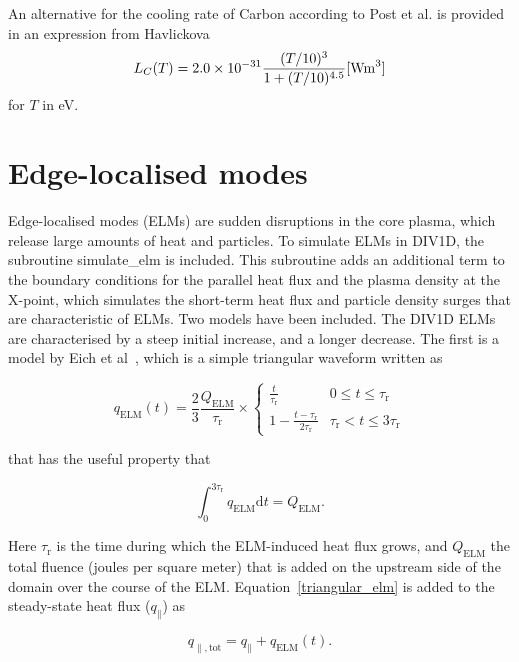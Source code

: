 \documentclass[amsmath,amssymb,a4]{revtex4-2}
\begin{document}
An alternative for the cooling rate of Carbon according to Post et al. is provided in an expression from Havlickova \cite{havlickova2013}
\begin{equation}
    L_C(T) = 2.0 \times 10^{-31} {(T/10)^3 \over 1 + (T/10)^{4.5}} [{\rm W m}^3]
\end{equation}
for $T$ in eV.


\section{Edge-localised modes}
\label{section:elms}

Edge-localised modes (ELMs) are sudden disruptions in the core plasma, which release large amounts of heat and particles. To simulate ELMs in DIV1D, the subroutine simulate\_elm is included. This subroutine adds an additional term to the boundary conditions for the parallel heat flux and the plasma density at the X-point, which simulates the short-term  heat flux and particle density surges that are characteristic of ELMs. Two models have been included. The DIV1D ELMs are characterised by a steep initial increase, and a longer decrease. The first is a model by Eich et al~\cite{eich2017}, which is a simple triangular waveform written as

\begin{equation}
\label{triangular_elm}
q_{\mathrm{ELM}}(t)=\frac{2}{3}\frac{Q_{\mathrm{ELM}}}{\tau_{\mathrm{r}}}\times
\left\{
\begin{matrix}
\frac{t}{\tau_{\mathrm{\mathrm{r}}}} &
0 \leq t \leq \tau_{\mathrm{r}} \\
1-\frac{t-\tau_{\mathrm{r}}}{2\tau_{\mathrm{r}}} &
\tau_{\mathrm{r}} < t \leq 3\tau_{\mathrm{r}}
\end{matrix}
\right.
\end{equation}

that has the useful property that

\begin{equation}
\int_{0}^{3\tau_{\mathrm{r}}} q_{\mathrm{ELM}} \mathrm{d}t=Q_{\mathrm{ELM}}.
\end{equation}

Here $\tau_{\mathrm{r}}$ is the time during which the ELM-induced heat flux grows, and $Q_{\mathrm{ELM}}$ the total fluence (joules per square meter) that is added on the upstream side of the domain over the course of the ELM. Equation~\ref{triangular_elm} is added to the steady-state heat flux ($q_{\parallel}$) as

\begin{equation}
\label{elm_boundary_condition}
q_{\parallel,\mathrm{tot}}=q_{\parallel}+q_{\mathrm{ELM}}(t).
\end{equation}
\end{document}
